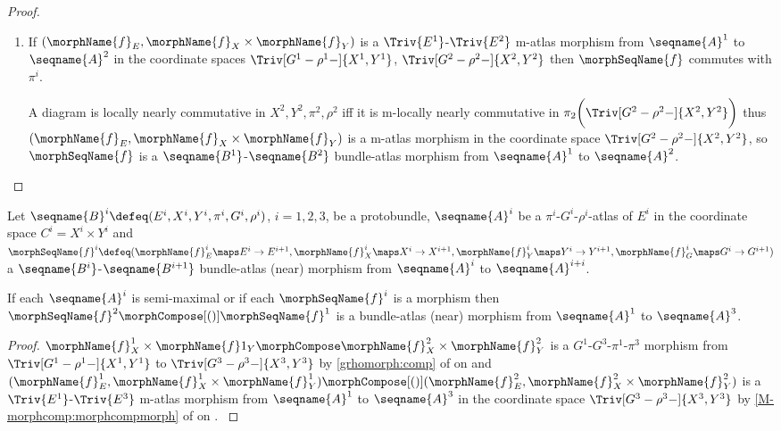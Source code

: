 \documentclass{article}
\begin{document}
\begin{lemma}
\begin{proof}
\begin{enumerate}
\item
If $(\morphName{f}_E, \morphName{f}_X \times \morphName{f}_Y)$ is a
$\Triv{E^1}$-$\Triv{E^2}$ m-atlas morphism from $\seqname{A}^1$ to
$\seqname{A}^2$ in the coordinate spaces $\Triv[G^1-\rho^1-]{X^1,Y^1}$,
$\Triv[G^2-\rho^2-]{X^2,Y^2}$ then $\morphSeqName{f}$ commutes with
$\pi^i$.

A diagram is locally nearly commutative in $X^2,Y^2,\pi^2,\rho^2$ iff it
is m-locally nearly commutative in
$\pi_2 \biggl ( \Triv[G^2-\rho^2-]{X^2,Y^2} \biggr )$
thus $(\morphName{f}_E, \morphName{f}_X \times \morphName{f}_Y)$ is a
m-atlas morphism in the coordinate space $\Triv[G^2-\rho^2-]{X^2,Y^2}$,
so $\morphSeqName{f}$ is a $\seqname{B^1}$-$\seqname{B^2}$ bundle-atlas
morphism from $\seqname{A}^1$ to $\seqname{A}^2$.
\end{enumerate}
\end{proof}
\end{lemma}

\begin{corollary}
\label{cor:Bun-ATLmorph}
Let
$
  \seqname{B}^i
  \defeq
  (
    E^i,
    X^i,
    Y^i,
    \pi^i,
    G^i,
    \rho^i
  )
$,
$i=1,2,3$, be a protobundle,
$\seqname{A}^i$ be a $\pi^i$-$G^i$-$\rho^i$-atlas of $E^i$ in the
coordinate space $C^i = X^i \times Y^i$ and
$
  \morphSeqName{f}^i
  \defeq
  (
    \morphName{f}^i_E \maps E^i \to E^{i+1},
    \morphName{f}^i_X \maps X^i \to X^{i+1},
    \morphName{f}^i_Y \maps Y^i \to Y^{i+1},
    \morphName{f}^i_G \maps G^i \to G^{i+1}
  )
$
a $\seqname{B^i}$-$\seqname{B^{i+1}}$ bundle-atlas (near) morphism from
$\seqname{A}^i$ to $\seqname{A}^{i+i}$.

If each $\seqname{A}^i$ is semi-maximal or if each $\morphSeqName{f}^i$
is a morphism then $\morphSeqName{f}^2 \morphCompose[()] \morphSeqName{f}^1$ is
a bundle-atlas (near) morphism from $\seqname{A}^1$ to $\seqname{A}^3$.

\begin{proof}
$
  \morphName{f}^1_X \times \morphName{f} 1_Y \morphCompose
  \morphName{f}^2_X \times \morphName{f}^2_Y
$
is a $G^1$-$G^3$-$\pi^1$-$\pi^3$ morphism from
$\Triv[G^1-\rho^1-]{X^1,Y^1}$ to $\Triv[G^3-\rho^3-]{X^3,Y^3}$ by
\cref{grhomorph:comp} of
{
  \showlabelsinline
   on
}
and
$
  (\morphName{f}^1_E, \morphName{f}^1_X \times \morphName{f}^1_Y)
  \morphCompose[()]
  (\morphName{f}^2_E, \morphName{f}^2_X \times \morphName{f}^2_Y)
$
is a $\Triv{E^1}$-$\Triv{E^3}$ m-atlas morphism from $\seqname{A}^1$ to
$\seqname{A}^3$ in the coordinate space $\Triv[G^3-\rho^3-]{X^3,Y^3}$ by
\cref{M-morphcomp:morphcompmorph} of
{
  \showlabelsinline
   on
  .
}
\end{proof}
\end{corollary}
\end{document}
